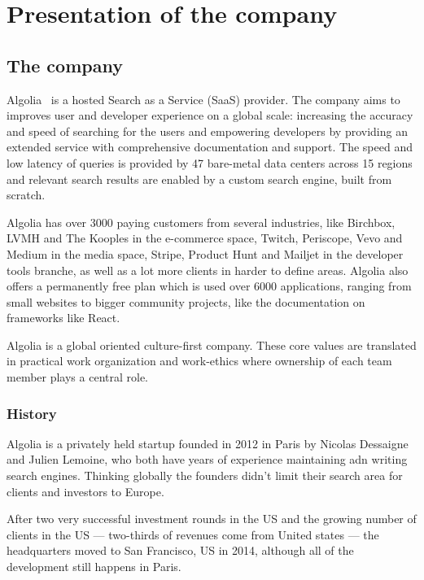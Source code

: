 
\chapter{Presentation of the company} %
\label{chp:presentation}

\section{The company} %
\label{sec:company}

Algolia~\cite{algolia-home} is a hosted Search as a Service (SaaS) provider. The company aims to improves user and developer experience on a global scale: increasing the accuracy and speed of searching for the users and empowering developers by providing an extended service with comprehensive documentation and support. The speed and low latency of queries is provided by 47 bare-metal data centers across 15 regions and relevant search results are enabled by a custom search engine, built from scratch.

Algolia has over 3000 paying customers from several industries, like Birchbox, LVMH and The Kooples in the e-commerce space, Twitch, Periscope, Vevo and Medium in the media space, Stripe, Product Hunt and Mailjet in the developer tools branche, as well as a lot more clients in harder to define areas. Algolia also offers a permanently free plan which is used over 6000 applications, ranging from small websites to bigger community projects, like the documentation on frameworks like React.

Algolia is a global oriented culture-first company. These core values are translated in practical work organization and work-ethics where ownership of each team member plays a central role.

\subsection{History}
\label{sub:history}

Algolia is a privately held startup founded in 2012 in Paris by Nicolas Dessaigne and Julien Lemoine, who both have years of experience maintaining adn writing search engines. Thinking globally the founders didn't limit their search area for clients and investors to Europe.

After two very successful investment rounds in the US and the growing number of clients in the US --- two-thirds of revenues come from United states \cite{less-mis} --- the headquarters moved to San Francisco, US in 2014, although all of the development still happens in Paris. 

